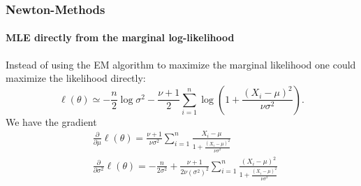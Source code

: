 \documentclass[aspectratio=169]{beamer}
\begin{document}
\begin{frame}
    \frametitle{Newton-Methods}
    \framesubtitle{MLE directly from the marginal log-likelihood}
    Instead of using the EM algorithm to maximize the marginal likelihood one could maximize the likelihood directly:
    \begin{equation}
        \ell(\theta)\simeq-\frac{n}{2}\log\sigma^{2}-
        \frac{\nu+1}{2}\sum_{i=1}^{n}\log\left(1+\frac{(X_{i}-\mu)^{2}}{\nu\sigma^{2}}\right).
    \end{equation}
    We have the gradient
    \begin{align*}
        &\frac{\partial}{\partial\mu}\ell(\theta)= \frac{\nu + 1}{\nu\sigma^2}\sum_{i=1}^{n}\frac{X_{i} - \mu}{1 + \frac{(X_{i}-\mu)^2}{\nu\sigma^2}} \\
        &\frac{\partial}{\partial\sigma^{2}}\ell(\theta) = -\frac{n}{2\sigma^2} +
        \frac{\nu + 1}{2\nu(\sigma^2)^2}\sum_{i=1}^{n}\frac{(X_{i}-\mu)^2}{1 + \frac{(X_{i}-\mu)^2}{\nu\sigma^2}}    
    \end{align*}
\end{frame}
\end{document}
